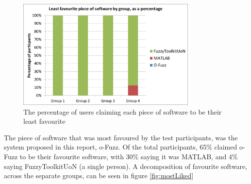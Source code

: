 \begin{figure}[ht!]
	\begin{center}
		\includegraphics[width=0.8\textwidth]{images/leastFav}
	\end{center}
	\vspace{-5mm}
	\captionsetup{justification=centering,margin=2cm}	
	\caption{The percentage of users claiming each piece of software to be their least favourite}
	\label{fig:leastFavour}
	\vspace{-2mm}
\end{figure}
\noindent 
The piece of software that was most favoured by the test participants, was the system proposed in this report, o-Fuzz. Of the total participants, 65\% claimed o-Fuzz to be their favourite software, with 30\% saying it was MATLAB, and 4\% saying FuzzyToolkitUoN (a single person). A decomposition of favourite software, across the separate groups, can be seen in figure \ref{fig:mostLiked}
			
